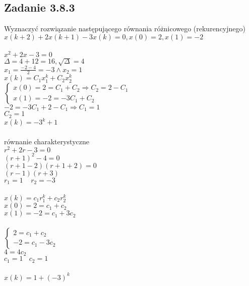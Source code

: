 \pagebreak
\subsection*{Zadanie 3.8.3} {\color{darkgray}
	Wyznaczyć rozwiązanie następującego równania różnicowego (rekurencyjnego)\\
	$x(k+2)+2x(k+1)-3x(k)=0, x(0)=2,x(1)=-2$
}\\\\
$x^2+2x-3=0$\\
$\Delta=4+12=16, \sqrt{\Delta}=4$\\
$x_1=\frac{-2-4}{2}=-3 \wedge x_2=1$\\
$x(k)=C_1x_1^k+C_2x_2^k$\\
$\begin{cases} x(0)=2=C_1+C_2 \Rightarrow C_2=2-C_1 \\ x(1)=-2=-3C_1+C_2\end{cases}$\\
$-2=-3C_1+2-C_1 \Rightarrow C_1=1$\\
$C_2=1$\\
$\boxed{x(k)=-3^k+1}$\\

\\
równanie charakterystyczne\\
$r^2+2r-3=0$\\
$(r+1)^2-4=0$\\
$(r+1-2)(r+1+2)=0$\\
$(r-1)(r+3)$\\
$r_1=1\ \ \ \ \ r_2=-3$\\
\\
$x(k)=c_1r_1^k+c_2r_2^k$\\
$x(0)=2=c_1+c_2$\\
$x(1)=-2=c_1+3c_2$\\
\\
$\begin{cases}2=c_1+c_2\\-2=c_1-3c_2 \end{cases}$\\
$4=4c_2$\\
$c_1=1\ \ \ \ c_2=1$\\
\\
$\boxed{x(k)=1+(-3)^k}$










